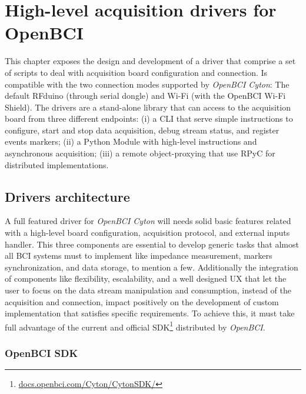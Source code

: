 \chapter{High-level acquisition drivers for OpenBCI}\label{ch:chapter_2}

This chapter exposes the design and development of a driver that comprise a set of scripts to deal with acquisition board configuration and connection. Is compatible with the two connection modes supported by \textit{OpenBCI Cyton}: The default RFduino (through serial dongle) and Wi-Fi (with the OpenBCI Wi-Fi Shield). The drivers are a stand-alone library that can access to the acquisition board from three different endpoints: 
(i) a \gls*{CLI} that serve simple instructions to configure, start and stop data acquisition, debug stream status, and register events markers; 
(ii) a Python Module with high-level instructions and asynchronous acquisition; (iii) a remote object-proxying that use \Gls*{RPyC} for distributed implementations.

\section{Drivers architecture}

A full featured driver for \textit{OpenBCI Cyton} will needs solid basic features related with a high-level board configuration, acquisition protocol, and external inputs handler. This three components are essential to develop generic tasks that almost all BCI systems must to implement like impedance measurement, markers synchronization, and data storage, to mention a few. Additionally the integration of components like flexibility, escalability, and a well designed \gls*{UX} that let the user to focus on the data stream manipulation and consumption, instead of the acquisition and connection, impact positively on the development of custom implementation that satisfies specific requirements. To achieve this, it must take full advantage of the current and official SDK\footnote{\href{https://docs.openbci.com/Cyton/CytonSDK/}{docs.openbci.com/Cyton/CytonSDK/}} distributed by \textit{OpenBCI}.



\subsection{OpenBCI SDK}

